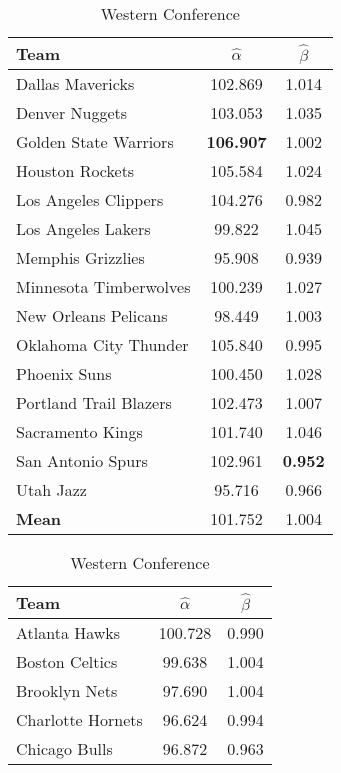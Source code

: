 \begin{table}[!ht]
\centering

\begin{subtable}[t]{0.5\textwidth}\centering
	\begin{tabular}[t]{|l|c|c|}
		\hline
		\textbf{Team}  & \textbf{$\hat{\alpha}$} & \textbf{$\hat{\beta}$} \\ \hline
		Dallas Mavericks & 102.869 & 1.014 \\ \hline
		Denver Nuggets & 103.053 & 1.035\\ \hline
		Golden State Warriors & \textbf{106.907} & 1.002\\ \hline
		Houston Rockets & 105.584 & 1.024 \\ \hline
		Los Angeles Clippers & 104.276 & 0.982\\ \hline
		Los Angeles Lakers & 99.822 & 1.045 \\ \hline
		Memphis Grizzlies & 95.908 & 0.939\\ \hline
		Minnesota Timberwolves & 100.239 & 1.027\\ \hline
		New Orleans Pelicans & 98.449 & 1.003\\ \hline
		Oklahoma City Thunder & 105.840 & 0.995\\ \hline
		Phoenix Suns & 100.450 & 1.028\\ \hline
		Portland Trail Blazers & 102.473 & 1.007\\ \hline
		Sacramento Kings & 101.740 & 1.046\\ \hline
		San Antonio Spurs & 102.961 & \textbf{0.952}\\ \hline
		Utah Jazz & 95.716 & 0.966\\ \hline
		\textbf{Mean} & 101.752 & 1.004\\ \hline
	\end{tabular}
\caption{Western Conference}
\end{subtable}\hfill
\begin{subtable}[t]{0.5\textwidth}\centering
	\begin{tabular}[t]{|l|c|c|}
		\hline
		\textbf{Team}  & \textbf{$\hat{\alpha}$} & \textbf{$\hat{\beta}$} \\ \hline
		Atlanta Hawks  & 100.728 & 0.990\\ \hline
		Boston Celtics & 99.638 & 1.004\\ \hline
		Brooklyn Nets  & 97.690 & 1.004\\ \hline
		Charlotte Hornets & 96.624 & 0.994\\ \hline
		Chicago Bulls & 96.872 & 0.963\\ \hline

\end{tabular}
\end{subtable}
\end{table}

